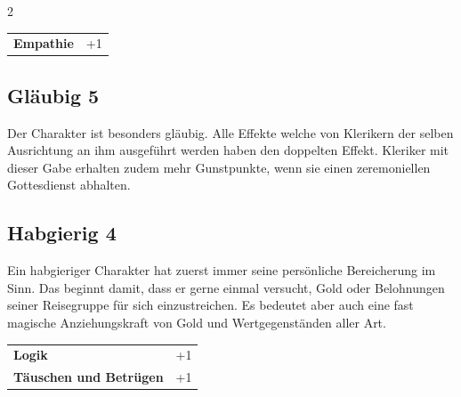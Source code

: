 \begin{multicols}{2}
\begin{tcolorbox}
\vspace{3mm}

\begin{tabular}{@{}ll@{}}
    \textbf{Empathie} & +1\\
\end{tabular}


\end{tcolorbox}

\begin{tcolorbox}
    \subsection*{Gläubig \hfill \small{5 }}
    \tcblower
Der Charakter ist besonders gläubig. Alle Effekte welche von Klerikern der selben Ausrichtung an ihm ausgeführt werden haben den doppelten Effekt. Kleriker mit dieser Gabe erhalten zudem mehr Gunstpunkte, wenn sie einen zeremoniellen Gottesdienst abhalten.


\vspace{3mm}



\end{tcolorbox}

\begin{tcolorbox}
    \subsection*{Habgierig \hfill \small{4 }}
    \tcblower
Ein habgieriger Charakter hat zuerst immer seine persönliche Bereicherung im Sinn. Das beginnt damit, dass er gerne einmal versucht, Gold oder Belohnungen seiner Reisegruppe für sich einzustreichen. Es bedeutet aber auch eine fast magische Anziehungskraft von Gold und Wertgegenständen aller Art.


\vspace{3mm}

\begin{tabular}{@{}ll@{}}
    \textbf{Logik} & +1\\
    \textbf{Täuschen und Betrügen} & +1\\
\end{tabular}


\end{tcolorbox}
\end{multicols}
